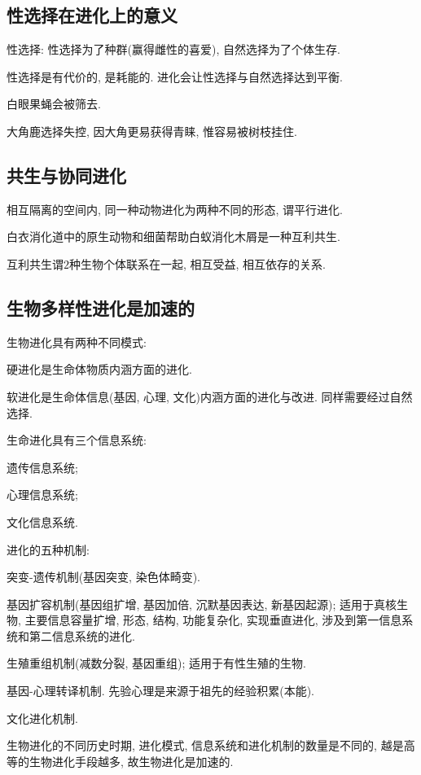 \documentclass{ctexart}
\begin{document}

\subsection{性选择在进化上的意义} %
\label{sub:性选择在进化上的意义}

性选择: 性选择为了种群(赢得雌性的喜爱), 自然选择为了个体生存.
\par
性选择是有代价的, 是耗能的. 进化会让性选择与自然选择达到平衡.
\begin{ex}
    白眼果蝇会被筛去.
\end{ex}
\begin{ex}
    大角鹿选择失控, 因大角更易获得青睐, 惟容易被树枝挂住.
\end{ex}

\subsection{共生与协同进化} %
\label{sub:共生与协同进化}

相互隔离的空间内, 同一种动物进化为两种不同的形态, 谓平行进化.
\begin{ex}
    白衣消化道中的原生动物和细菌帮助白蚁消化木屑是一种互利共生.
\end{ex}
互利共生谓$2$种生物个体联系在一起,  相互受益, 相互依存的关系.


\subsection{生物多样性进化是加速的} %
\label{sub:生物多样性进化是加速的}

生物进化具有两种不同模式:
\begin{cenum}
    \item 硬进化是生命体物质内涵方面的进化.
    \item 软进化是生命体信息(基因, 心理, 文化)内涵方面的进化与改进. 同样需要经过自然选择.
\end{cenum}
生命进化具有三个信息系统:
\begin{cenum}
    \item 遗传信息系统;
    \item 心理信息系统;
    \item 文化信息系统.
\end{cenum}
进化的五种机制:
\begin{cenum}
    \item 突变-遗传机制(基因突变, 染色体畸变).
    \item 基因扩容机制(基因组扩增, 基因加倍, 沉默基因表达, 新基因起源); 适用于真核生物, 主要信息容量扩增, 形态, 结构, 功能复杂化, 实现垂直进化, 涉及到第一信息系统和第二信息系统的进化.
    \item 生殖重组机制(减数分裂, 基因重组); 适用于有性生殖的生物.
    \item 基因-心理转译机制. 先验心理是来源于祖先的经验积累(本能).
    \item 文化进化机制.
\end{cenum}
生物进化的不同历史时期, 进化模式, 信息系统和进化机制的数量是不同的, 越是高等的生物进化手段越多, 故生物进化是加速的.


\end{document}
